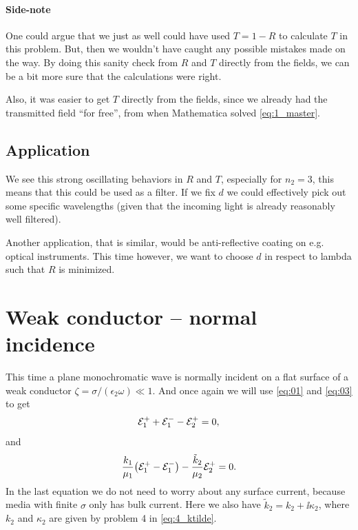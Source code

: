 \documentclass[11pt,letter, swedish, english
]{article}
\begin{document}
\paragraph{Side-note}
One could argue that we just as well could have used $T=1-R$ to
calculate $T$ in this problem. But, then we wouldn't have caught any
possible mistakes made on the way. By doing this sanity check from $R$
and $T$ directly from the fields, we can be a bit more sure that the
calculations were right. 

Also, it was easier to get $T$ directly from the fields, since we
already had the transmitted field ``for free'', from when Mathematica
solved \eqref{eq:1_master}. 




\subsection{Application}
We see this strong oscillating behaviors in $R$ and $T$, especially
for $n_2=3$, this means that this could be used as a filter. If we fix
$d$ we could effectively pick out some specific wavelengths (given
that the incoming light is already reasonably well filtered). 

Another application, that is similar, would be anti-reflective coating
on e.g. optical instruments. This time however, we want to
choose $d$ in respect to lambda such that $R$ is minimized. 







\section{Weak conductor -- normal incidence}
\newcommand{\kt}{\tilde{k}}

This time a plane monochromatic wave is normally incident on a flat
surface of a weak conductor $\zeta=\sigma/(\epsilon_2\omega)\ll1$. And
once again we will use \eqref{eq:01} and \eqref{eq:03} to get
\begin{equation}\label{eq:2_BC1}
{\mathcal{E}_1^+}+{\mathcal{E}_1^-} -{\mathcal{E}_2^+} =0, 
\end{equation}
and 
\begin{equation}\label{eq:2_BC2}
\frac{k_1}{\mu_1}\qty(\Ep-\Em) 
-\frac{\kt_2}{\mu_2}\Epp =0.
\end{equation}
In the last equation we do not need to worry about any surface
current, because media with finite $\sigma$ only has bulk
current. Here we also have $\kt_{2} = k_2 + \ii\kappa_2$, where
$k_2$ and $\kappa_2$ are given by problem 4 in \eqref{eq:4_ktilde}.
\end{document}
